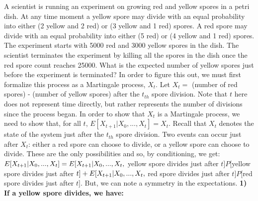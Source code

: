 \documentclass[12pt]{article}
\begin{document}
A scientist is running an experiment on growing red and yellow spores in a petri dish. At any time moment a yellow spore
may divide with an equal probability into either (2 yellow and 2 red) or (3 yellow and 1 red) spores. A red spore may 
divide with an equal probability into either (5 red) or (4 yellow and 1 red) spores. The experiment starts with 5000 red
and 3000 yellow spores in the dish.
\newline
The scientist terminates the experiment by killing all the spores in the dish once the red spore count reaches 25000. What
is the expected number of yellow spores just before the experiment is terminated?
\newline
\newline
In order to figure this out, we must first formalize this process as a Martingale process, $X_t$. 
\newline
Let $X_t = $ (number of red spores) - (number of yellow spores) after the $t_{th}$ spore division. Note that $t$ here does not
represent time directly, but rather represents the number of divisions since the process began.
\newline
\newline
In order to show that $X_t$ is a Martingale process, we need to show that, for all $t$, 
\newline
$E[X_{t+1} | X_0, ..., X_t] = X_t$. Recall
that $X_t$ denotes the state of the system just after the $t_{th}$ spore division.
\newline
\newline
Two events can occur just after $X_t$: either a red spore can choose to divide, or a yellow spore can choose to divide. These
are the only possibilities and so, by conditioning, we get:
\newline
\newline
$E[X_{t+1} | X_0, ..., X_t] 
\newline = E[X_{t+1} | X_0, ..., X_t,$ yellow spore divides just after $t] P[$yellow spore divides just after $t]
\newline + E[X_{t+1} | X_0, ..., X_t,$ red spore divides just after $t] P[$red spore divides just after $t]$.
\newline
\newline
But, we can note a symmetry in the expectations. 
\newline
\newline
\textbf{1) If a yellow spore divides, we have:}
\newline
\end{document}
